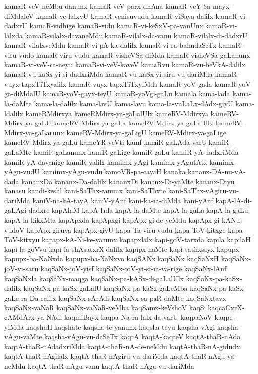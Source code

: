 {kamaR-veV-neMbu-danunx
kamaR-veV-parx-dhAna
kamaR-veY-Sa-mayx-diMdaleV
kamaR-ve-lalxvU
kamaR-venisuvudu
kamaR-viSaya-dalilx
kamaR-vi-dadxrU
kamaR-vidhige
kamaR-vidu
kamaR-vi-keSxV-pa-vanUnx
kamaR-vi-lalxda
kamaR-vilalx-davaneMdu
kamaR-vilalx-da-vanu
kamaR-vilalx-di-dadxrU
kamaR-vilalxveMdu
kamaR-vi-pA-ka-dalilx
kamaR-vi-ra-bahudaSeTx
kamaR-viru-vudo
kamaR-viru-vudu
kamaR-visheVSa-diMda
kamaR-visheVSa-gaLanunx
kamaR-vi-veV-ca-neyu
kamaR-vi-veV-kaveV
kamaRvu
kamaR-vu-beVkA-dalilx
kamaR-vu-kaSx-yi-si-dadxriMda
kamaR-vu-kaSx-yi-siru-vu-dariMda
kamaR-vuyx-tapxTiTxyalilx
kamaR-vuyx-tapxTiTxyiMda
kamaR-yoV-gada
kamaR-yoV-ga-diMdalU
kamaR-yoV-gayx-teyU
kamaR-yoVgi-gaLu
kamala
kama-lada
kama-la-daMte
kama-la-dalilx
kama-lavU
kama-lavu
kama-la-vuLaLx-dAdx-giyU
kama-ldalilx
kameRMdirxya
kameRMdirx-ya-gaLalUlx
kameRV-Mdirxya
kameRV-Mdirx-ya-gaLU
kameRV-Mdirx-ya-gaLa
kameRV-Mdirx-ya-gaLalUlx
kameRV-Mdirx-ya-gaLanunx
kameRV-Mdirx-ya-gaLigU
kameRV-Mdirx-ya-gaLige
kameRV-Mdirx-ya-gaLu
kameYR-veVti
kamf
kamiR-gaLAda-varU
kamiR-gaLaMte
kamiR-gaLanunx
kamiR-gaLige
kamiR-gaLu
kamiR-yA-dadxriMda
kamiR-yA-davanige
kamiR-yalilx
kamimx-yAgi
kamimx-yAgutAtx
kamimx-yAgu-vudU
kamimx-yAgu-vudu
kamoVR-pa-cayaH
kanaka
kananx-DA-nu-vA-dada
kananxDa
kananx-Da-dalilx
kananxDi
kananx-Di-yaMte
kananx-Diyu
kanasu
kandi-keshl
kani-SaThx-ranunx
kani-SaThxte
kani-SaThx-vAgiru-vu-dariMda
kaniV-na-kA-tayA
kaniV-yAnf
kani-ka-ra-diMda
kani-yAnf
kapA-lA-di-gaLAgi-dadxre
kapAlaM
kapA-lada
kapA-la-daMte
kapA-la-gaLa
kapA-la-gaLu
kapA-la-kikxMta
kapApxda
kapApxgi
kapApx-gi-de-yeMdu
kapApx-gi-kANu-vudoV
kapApx-giruva
kapApx-giyU
kapa-Ta-viru-vudu
kapa-ToV-kitxge
kapa-ToV-kitxyu
kapapx-kA-Ni-ke-yanunx
kapapxlalx
kapi-goV-tarxda
kapila
kapilaH
kapi-la-goVvu
kapi-la-shAsatxrX-dalilx
kapipx-naMte
kapi-tathxsayx
kapupx
kapupx-ba-NaNxda
kapupx-ba-NaNxvo
kaqSANx
kaqSaNx
kaqSaNxH
kaqSaNx-joV-yi-saru
kaqSaNx-joV-yisf
kaqSaNx-joV-yi-sf-ra-va-rige
kaqSaNx-lAnf
kaqSaNxla
kaqSaNx-maqga
kaqSaNx-pa-kASx-di-gaLalUlx
kaqSaNx-pa-kaSx-dalilx
kaqSaNx-pa-kaSx-gaLalU
kaqSaNx-pa-kaSx-gaLeMba
kaqSaNx-pa-kaSx-gaLe-ra-Da-ralilx
kaqSaNx-sArAdi
kaqSaNx-sa-paR-daMte
kaqSaNxtavx
kaqSaNx-vaNaR
kaqSaNx-vaNaR-veMba
kaqSamx-keVshoV
kaqSi
kaqcaCxrX-cAMdArx-ya-NAdi
kaqmiBayx
kaqpa-Na-ra-lalx-da-varU
kaqpaNoV
kaqpe-yiMda
kaqshaH
kaqshate
kaqsha-te-yanunx
kaqsha-teyu
kaqsha-vAgi
kaqsha-vAgu-vaMte
kaqsha-vAgu-vu-daSeTx
kaqtA
kaqtA-kaqteV
kaqtA-thaR-nAda
kaqtA-thaR-nAdadxriMda
kaqtA-thaR-nA-de-neMdu
kaqtA-thaR-nA-gidudx
kaqtA-thaR-nAgilalx
kaqtA-thaR-nAgiru-vu-dariMda
kaqtA-thaR-nAgu-va-neMdu
kaqtA-thaR-nAgu-vanu
kaqtA-thaR-nAgu-vu-dariMda
}
